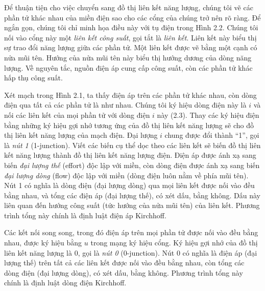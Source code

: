 Để thuận tiện cho việc chuyển sang đồ thị liên kết năng lượng, chúng tôi vẽ các phần tử khác nhau của miền điện sao cho các cổng của chúng trở nên rõ ràng. Để ngắn gọn, chúng tôi chỉ minh họa điều này với tụ điện trong Hình 2.2. Chúng tôi nối vào cổng này một \emph{liên kết công suất}, gọi tắt là \emph{liên kết}. Liên kết này biểu thị sự trao đổi năng lượng giữa các phần tử. Một liên kết được vẽ bằng một cạnh có nửa mũi tên. Hướng của nửa mũi tên này biểu thị hướng dương của dòng năng lượng. Về nguyên tắc, nguồn điện áp cung cấp công suất, còn các phần tử khác hấp thụ công suất.

Xét mạch trong Hình 2.1, ta thấy điện áp trên các phần tử khác nhau, còn dòng điện qua tất cả các phần tử là như nhau. Chúng tôi ký hiệu dòng điện này là $i$ và nối các liên kết của mọi phần tử với dòng điện $i$ này (2.3). Thay các ký hiệu điện bằng những ký hiệu gợi nhớ tương ứng của đồ thị liên kết năng lượng sẽ cho đồ thị liên kết năng lượng của mạch điện. Đại lượng $i$ chung được đổi thành ``1'', gọi là \emph{nút 1} (1-junction). Viết các biến cụ thể dọc theo các liên kết sẽ biến đồ thị liên kết năng lượng thành đồ thị liên kết năng lượng điện. Điện áp được ánh xạ sang biến \emph{đại lượng thế} (effort) độc lập với miền, còn dòng điện được ánh xạ sang biến \emph{đại lượng dòng} (flow) độc lập với miền (dòng điện luôn nằm về phía mũi tên). Nút 1 có nghĩa là dòng điện (đại lượng dòng) qua mọi liên kết được nối vào đều bằng nhau, và tổng các điện áp (đại lượng thế), có xét dấu, bằng không. Dấu này liên quan đến hướng công suất (tức hướng của nửa mũi tên) của liên kết. Phương trình tổng này chính là định luật điện áp Kirchhoff.

Các kết nối song song, trong đó điện áp trên mọi phần tử được nối vào đều bằng nhau, được ký hiệu bằng $u$ trong mạng ký hiệu cổng. Ký hiệu gợi nhớ của đồ thị liên kết năng lượng là 0, gọi là \emph{nút 0} (0-junction). Nút 0 có nghĩa là điện áp (đại lượng thế) trên tất cả các liên kết được nối vào đều bằng nhau, còn tổng các dòng điện (đại lượng dòng), có xét dấu, bằng không. Phương trình tổng này chính là định luật dòng điện Kirchhoff.

